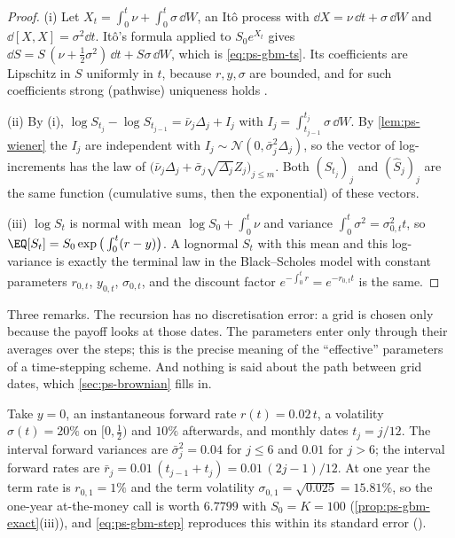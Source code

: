 \begin{proof}
(i) Let $X_t=\int_0^t\nu+\int_0^t\sigma\,\dd W$, an It\^o process with
$\dd X=\nu\,\dd t+\sigma\,\dd W$ and $\dd[X,X]=\sigma^2\dd t$. It\^o's formula applied to
$S_0e^{X_t}$ gives $\dd S=S\,(\nu+\tfrac12\sigma^2)\,\dd t+S\sigma\,\dd W$, which is
\eqref{eq:ps-gbm-ts}. Its coefficients are Lipschitz in $S$ uniformly in $t$, because
$r,y,\sigma$ are bounded, and for such coefficients strong (pathwise) uniqueness holds
\citep[Theorem~5.2.5]{karatzas-shreve}.

(ii) By (i), $\log S_{t_j}-\log S_{t_{j-1}}=\bar\nu_j\Delta_j+I_j$ with
$I_j=\int_{t_{j-1}}^{t_j}\sigma\,\dd W$. By \cref{lem:ps-wiener} the $I_j$ are independent
with $I_j\sim\mathcal N(0,\bar\sigma_j^2\Delta_j)$, so the vector of log-increments has the
law of $\big(\bar\nu_j\Delta_j+\bar\sigma_j\sqrt{\Delta_j}Z_j\big)_{j\le m}$. Both
$(S_{t_j})_j$ and $(\hat S_j)_j$ are the same function (cumulative sums, then the
exponential) of these vectors.

(iii) $\log S_t$ is normal with mean $\log S_0+\int_0^t\nu$ and variance
$\int_0^t\sigma^2=\sigma_{0,t}^2t$, so
$\EQ[S_t]=S_0\exp\big(\int_0^t(r-y)\big)$. A lognormal $S_t$ with this mean and this
log-variance is exactly the terminal law in the Black--Scholes model with constant
parameters $r_{0,t}$, $y_{0,t}$, $\sigma_{0,t}$, and the discount factor
$e^{-\int_0^tr}=e^{-r_{0,t}t}$ is the same.
\end{proof}

Three remarks. The recursion has no discretisation error: a grid is chosen only because
the payoff looks at those dates. The parameters enter only through their averages over the
steps; this is the precise meaning of the ``effective'' parameters of a time-stepping
scheme. And nothing is said about the path between grid dates, which \cref{sec:ps-brownian}
fills in.

\begin{example}\label{exa:ps-term}
Take $y=0$, an instantaneous forward rate $r(t)=0.02\,t$, a volatility $\sigma(t)=20\%$
on $[0,\frac12)$ and $10\%$ afterwards, and monthly dates $t_j=j/12$. The interval forward
variances are $\bar\sigma_j^2=0.04$ for $j\le6$ and $0.01$ for $j>6$; the interval forward
rates are $\bar r_j=0.01\,(t_{j-1}+t_j)=0.01\,(2j-1)/12$. At one year the term rate is
$r_{0,1}=1\%$ and the term volatility $\sigma_{0,1}=\sqrt{0.025}=15.81\%$, so the one-year
at-the-money call is worth $6.7799$ with $S_0=K=100$ (\cref{prop:ps-gbm-exact}(iii)), and
\eqref{eq:ps-gbm-step} reproduces this within its standard error
().
\end{example}

